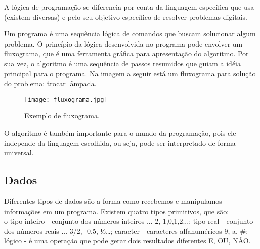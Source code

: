 \documentclass[journal]{IEEEtran}
\begin{document}
A lógica de programação se diferencia por conta da linguagem específica que usa (existem diversas) e pelo seu objetivo específico de resolver problemas digitais.


Um programa é uma sequência lógica de comandos que buscam solucionar algum problema. O princípio da lógica desenvolvida no programa pode envolver um fluxograma, que é uma ferramenta gráfica para apresentação do algoritmo. Por sua vez, o algoritmo é uma sequência de passos resumidos que guiam a idéia principal para o programa. Na imagem a seguir está um fluxograma para solução do problema: trocar lâmpada.



\begin{figure}[!htbp]
\centering
\texttt{[image: fluxograma.jpg]}
\caption{Exemplo de fluxograma.}
\label{fig:fig_exemple}
\end{figure}


O algoritmo é também importante para o mundo da programação, pois ele independe da linguagem escolhida, ou seja, pode ser interpretado de forma universal.


\subsection{Dados}
Diferentes tipos de dados são a forma como recebemos e manipulamos informações em um programa. Existem quatro tipos primitivos, que são: 
\\ o tipo inteiro - conjunto dos números inteiros {...-2,-1,0,1,2...}; 
tipo real - conjunto dos números reais { ...-3/2, -0.5, ⅓…}; 
caracter - caracteres alfanuméricos {9, a, #}; 
lógico - é uma operação que pode gerar dois resultados diferentes { E, OU, NÃO}.
\end{document}
